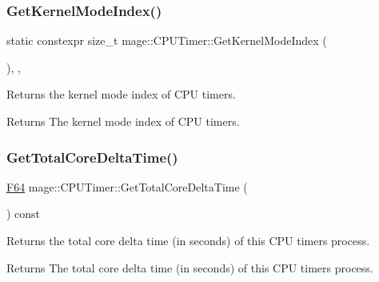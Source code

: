 \subsubsection{\texorpdfstring{Get\+Kernel\+Mode\+Index()}{GetKernelModeIndex()}}
{\footnotesize\ttfamily static constexpr size\+\_\+t mage\+::\+C\+P\+U\+Timer\+::\+Get\+Kernel\+Mode\+Index (\begin{DoxyParamCaption}{ }\end{DoxyParamCaption})\hspace{0.3cm}{\ttfamily [static]}, {\ttfamily [private]}, {\ttfamily [noexcept]}}

Returns the kernel mode index of C\+PU timers.

\begin{DoxyReturn}{Returns}
The kernel mode index of C\+PU timers. 
\end{DoxyReturn}
\hypertarget{classmage_1_1_c_p_u_timer_adb10ccea8664d1400d88953192a5a111}{}\label{classmage_1_1_c_p_u_timer_adb10ccea8664d1400d88953192a5a111} 
\subsubsection{\texorpdfstring{Get\+Total\+Core\+Delta\+Time()}{GetTotalCoreDeltaTime()}}
{\footnotesize\ttfamily \hyperlink{namespacemage_ad26233bbec640deda836e572c1a23708}{F64} mage\+::\+C\+P\+U\+Timer\+::\+Get\+Total\+Core\+Delta\+Time (\begin{DoxyParamCaption}{ }\end{DoxyParamCaption}) const\hspace{0.3cm}{\ttfamily [noexcept]}}

Returns the total core delta time (in seconds) of this C\+PU timer\textquotesingle{}s process.

\begin{DoxyReturn}{Returns}
The total core delta time (in seconds) of this C\+PU timer\textquotesingle{}s process. 
\end{DoxyReturn}
\hypertarget{classmage_1_1_c_p_u_timer_af098c9df9e25e29beee131bb1de8c482}{}\label{classmage_1_1_c_p_u_timer_af098c9df9e25e29beee131bb1de8c482} 
